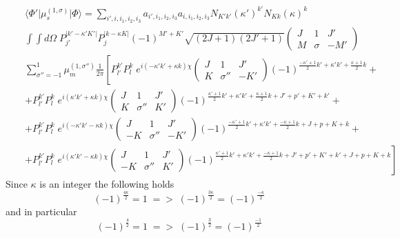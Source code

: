 \begin{eqnarray} \nonumber &&
\langle \Phi' \vert \mu^{(1,\sigma)}_s \vert \Phi \rangle = 
\sum_{i',i,i_1,i_2,i_3} a_{i',i_1,i_2,i_3} a_{i,i_1,i_2,i_3} N_{K'k'} (\kappa')^{k'} N_{Kk} (\kappa)^{k}
\\ \nonumber &&
\int \int d\Omega \; P^{\vert k' - \kappa' K' \vert}_{j'} P^{\vert k - \kappa K \vert}_{j}
(-1)^{M'+K'} \sqrt{(2 J+1)(2 J'+1)} 
\left( \begin{array}{ccc} 
 J &      1 &  J' \\
 M & \sigma & -M'  \end{array} \right)
\\ \nonumber &&
\sum^{1}_{\sigma'' = -1} \mu^{(1,\sigma'')}_m \frac{1}{2 \pi}
\left[ P^{k'}_{l'}  P^{k}_{l} \; e^{i(- \kappa' k'+ \kappa k) \chi  }
\left( \begin{array}{ccc} 
 J &        1 &  J' \\
 K & \sigma'' & -K'  \end{array} \right) (-1)^{ \frac{- \kappa' +1}{2} k' + \kappa' k' + \frac{ \kappa +1}{2} k } \right. +
\\ \nonumber &&
+ P^{k'}_{l'}  P^{k}_{l} \; e^{i( \kappa' k'+ \kappa k) \chi  }
\left( \begin{array}{ccc} 
 J &        1 &  J' \\
 K & \sigma'' &  K'  \end{array} \right) (-1)^{\frac{\kappa' +1}{2} k' + \kappa' k' + \frac{ \kappa +1}{2} k + J'+p'+K'+k'} +
\\ \nonumber &&
+ P^{k'}_{l'}  P^{k}_{l} \; e^{i(- \kappa' k' - \kappa k) \chi  }
\left( \begin{array}{ccc} 
 J &        1 &  J' \\
-K & \sigma'' & -K'  \end{array} \right) (-1)^{\frac{- \kappa' +1}{2} k' + \kappa' k' + \frac{- \kappa +1}{2} k + J+p+K+k} +
\\           &&
\left. + P^{k'}_{l'}  P^{k}_{l} \; e^{i( \kappa' k' - \kappa k) \chi  }
\left( \begin{array}{ccc} 
 J &        1 &  J' \\
-K & \sigma'' &  K'  \end{array} \right) (-1)^{\frac{ \kappa' +1}{2} k' + \kappa' k' + \frac{- \kappa +1}{2} k + J'+p'+K'+k' + J+p+K+k} \right]
\end{eqnarray}
Since $\kappa$ is an integer the following holds 
\begin{equation}
(-1)^{\frac{4 \kappa}{2} } = 1  \; => \; (-1)^{\frac{3 \kappa}{2} } = (-1)^{\frac{- \kappa}{2} }
\end{equation}
and in particular
\begin{equation}
(-1)^{\frac{4}{2} } = 1  \; => \; (-1)^{\frac{3}{2} } = (-1)^{\frac{-1}{2} }
\end{equation}

